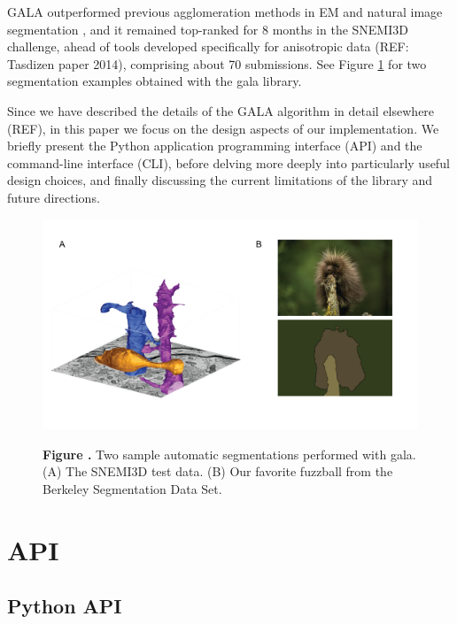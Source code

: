 \documentclass{frontiersSCNS} %
\begin{document}
GALA outperformed previous agglomeration methods in EM and natural image segmentation \citep{NunezIglesias:2013cd}, and it remained top-ranked for 8 months in the SNEMI3D challenge, ahead of tools developed specifically for anisotropic data \citep{snemi, Liu:2012ba, Kaynig:2013tv} (REF: Tasdizen paper 2014), comprising about 70 submissions.
See Figure \ref{fig:01} for two segmentation examples obtained with the gala library.

Since we have described the details of the GALA algorithm in detail elsewhere (REF), in this paper we focus on the design aspects of our implementation.
We briefly present the Python application programming interface (API) and the command-line interface (CLI), before delving more deeply into particularly useful design choices, and finally discussing the current limitations of the library and future directions.


\begin{figure}
\begin{center}
\includegraphics[width=18cm]{figure1}
\end{center}
 \textbf{\label{fig:01} Figure .}{ Two sample automatic segmentations performed with gala. (A) The SNEMI3D test data. (B) Our favorite fuzzball from the Berkeley Segmentation Data Set. }
\end{figure}


\section{API}


\subsection{Python API}
\end{document}
